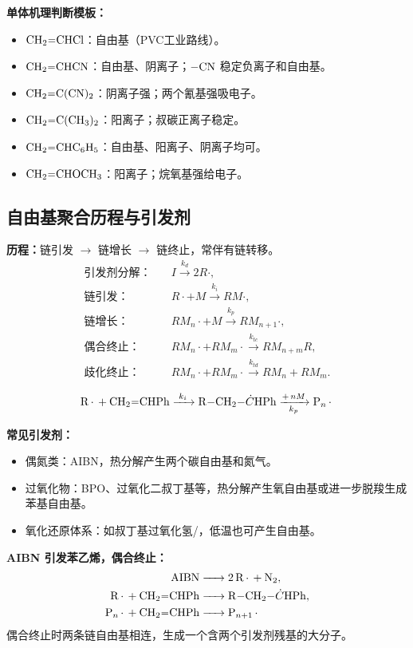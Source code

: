 \documentclass[UTF8,a4paper,10pt,twocolumn]{ctexart}
\newcommand{\kp}{k_p}
\newcommand{\kd}{k_d}
\newcommand{\ki}{k_i}
\begin{document}
\begin{examplebox}
  \textbf{单体机理判断模板：}
  \begin{itemize}
    \item $\ce{CH2=CHCl}$：自由基（PVC工业路线）。
    \item $\ce{CH2=CHCN}$：自由基、阴离子；$\ce{-CN}$ 稳定负离子和自由基。
    \item $\ce{CH2=C(CN)2}$：阴离子强；两个氰基强吸电子。
    \item $\ce{CH2=C(CH3)2}$：阳离子；叔碳正离子稳定。
    \item $\ce{CH2=CHC6H5}$：自由基、阳离子、阴离子均可。
    \item $\ce{CH2=CHOCH3}$：阳离子；烷氧基强给电子。
  \end{itemize}
\end{examplebox}

\subsection{自由基聚合历程与引发剂}
\textbf{历程：}链引发 $\to$ 链增长 $\to$ 链终止，常伴有链转移。
\begin{align*}
  \text{引发剂分解：} & \quad I \xrightarrow{\kd}2R\cdot,                       \\
  \text{链引发：}   & \quad R\cdot+M\xrightarrow{\ki}RM\cdot,                 \\
  \text{链增长：}   & \quad RM_n\cdot+M\xrightarrow{\kp}RM_{n+1}\cdot,        \\
  \text{偶合终止：}  & \quad RM_n\cdot+RM_m\cdot\xrightarrow{k_{tc}}RM_{n+m}R, \\
  \text{歧化终止：}  & \quad RM_n\cdot+RM_m\cdot\xrightarrow{k_{td}}RM_n+RM_m.
\end{align*}

\[
  \ce{R. + CH2=CHPh ->[$k_i$] R-CH2-\dot{C}HPh ->[$+\,nM$][$k_p$] P_n.}
\]

\textbf{常见引发剂：}
\begin{itemize}
  \item 偶氮类：AIBN，热分解产生两个碳自由基和氮气。
  \item 过氧化物：BPO、过氧化二叔丁基等，热分解产生氧自由基或进一步脱羧生成苯基自由基。
  \item 氧化还原体系：如叔丁基过氧化氢/，低温也可产生自由基。
\end{itemize}

\begin{examplebox}
  \textbf{AIBN 引发苯乙烯，偶合终止：}
  \begin{align*}
    \ce{AIBN            & -> 2R. + N2},         \\
    \ce{R. + CH2=CHPh   & -> R-CH2-\dot{C}HPh}, \\
    \ce{P_n. + CH2=CHPh & -> P_{n+1}.}
  \end{align*}
  偶合终止时两条链自由基相连，生成一个含两个引发剂残基的大分子。
\end{examplebox}
\end{document}
